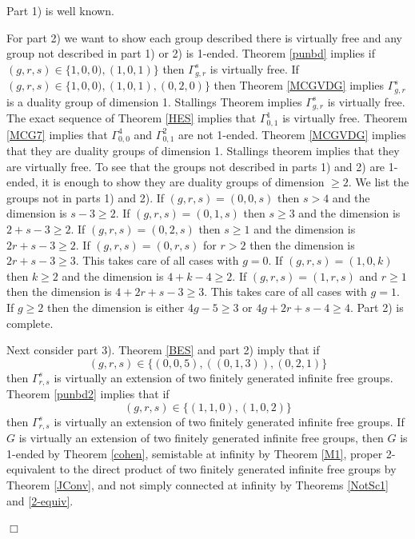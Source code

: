\documentclass[12pt]{article}
\newenvironment{proof}{\addvspace{12pt}\noindent{\bf Proof:}}{
$\Box$\par\addvspace{12pt}}
\begin{document}
 \begin{proof}
 Part 1) is well known. 
 
 For part 2) we want to show each group described there is virtually free and any group not described in part 1) or 2) is 1-ended. Theorem \ref{punbd} implies if $(g,r,s)\in \{1,0,0), (1,0,1)\}$ then $\Gamma_{g,r}^s$ is virtually free. If $(g,r,s)\in \{1,0,0), (1,0,1), (0,2,0)\}$ then Theorem \ref{MCGVDG} implies $\Gamma_{g,r}^s$ is a duality group of dimension 1. Stallings Theorem implies $\Gamma_{g,r}^s$ is virtually free. The exact sequence of Theorem \ref{HES} implies that $\Gamma_{0,1}^1$ is virtually free. Theorem \ref{MCG7} implies that $\Gamma_{0,0}^4$ and $\Gamma_{0,1}^2$ are not 1-ended. Theorem \ref{MCGVDG} implies that they are duality groups of dimension 1. Stallings theorem implies that they are virtually free. To see that the groups not described in parts 1) and 2) are 1-ended, it is enough to show they are duality groups of dimension $\geq 2$. We list the groups not in parts 1) and 2). If $(g,r,s)=(0,0,s)$ then $s>4$ and the dimension is $s-3\geq 2$. If $(g,r,s)=(0,1,s)$ then $s\geq 3$ and the dimension is $2+s-3\geq 2$.
 If $(g,r,s)=(0,2,s)$ then $s\geq 1$ and the dimension is $2r+s-3\geq 2$. 
 If $(g,r,s)=(0,r,s)$ for $r>2$ then the dimension is $2r+s-3\geq 3$. This takes care of all cases with $g=0$. 
 If $(g,r,s)=(1,0,k)$ then $k\geq 2$ and the dimension is $4+k-4\geq 2$. If $(g,r,s)=(1,r,s)$ and $r\geq 1$ then the dimension is $4+2r+s-3\geq 3$. This takes care of all cases with $g=1$. If $g\geq 2$ then the dimension is either $4g-5\geq 3$ or $4g+2r+s-4\geq 4$. Part 2) is complete. 
 
 Next consider part 3). Theorem \ref{BES}  and part 2) imply that if 
 $$(g,r,s)\in \{(0,0,5), ((0,1,3)), (0,2,1)\}$$ 
 then $\Gamma_{r,s}^s$ is virtually an extension of two finitely generated infinite free groups. Theorem \ref{punbd2} implies that if 
 $$(g,r,s)\in \{(1,1,0), (1,0,2)\}$$ 
 then $\Gamma_{r,s}^s$ is virtually an extension of two finitely generated infinite free groups. If $G$ is virtually an extension of two finitely generated infinite free groups, then $G$ is 1-ended by Theorem \ref{cohen}, semistable at infinity by Theorem \ref{M1}, proper 2-equivalent to the direct product of two finitely generated infinite free groups by Theorem \ref{JConv}, and not simply connected at infinity by Theorems \ref{NotSc1} and \ref{2-equiv}. 


\end{proof}
\end{document}
